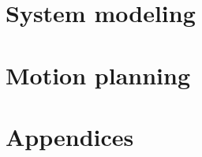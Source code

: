\documentclass[10pt]{book}
\begin{document}
\part{System modeling}
\label{part:system_modeling}
\renewcommand*{\partpath}{system-modeling}





\part{Motion planning}
\label{part:motion_planning}
\renewcommand*{\partpath}{motion-planning}




\part{Appendices}
\renewcommand{\chaptermark}[1]{\markboth{\sffamily\normalsize\bfseries\appendixname\ \thechapter.\ #1}{}}
\appendix
\renewcommand*{\partpath}{appendices}






\renewcommand{\chaptermark}[1]{%
  \markboth{\sffamily\normalsize\bfseries #1}
           {\sffamily\normalsize\bfseries #1}}
\renewcommand{\sectionmark}[1]{%
  \markright{\sffamily\normalsize\bfseries #1}
            {\sffamily\normalsize\bfseries #1}}

\backmatter
{}




\end{document}
